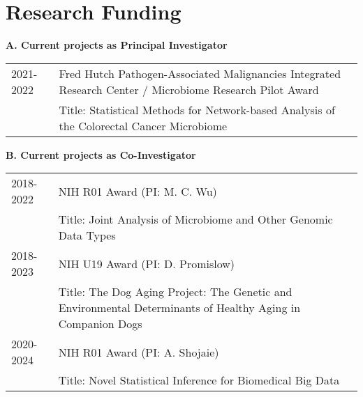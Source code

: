 \documentclass[10pt]{article}
\begin{document}

\section*{Research Funding }

\textbf{A. Current projects as Principal Investigator}
\begin{table}[H]
\hskip0.9cm\begin{tabular}{p{1.6cm}p{12cm}}
2021-2022 & Fred Hutch Pathogen-Associated Malignancies Integrated Research Center / Microbiome Research Pilot Award  \\
& Title: Statistical Methods for Network-based Analysis of the Colorectal Cancer Microbiome \\
\end{tabular}
\end{table}


\textbf{B. Current projects as Co-Investigator}

\begin{table}[H]
\hskip0.9cm\begin{tabular}{p{1.6cm}p{12cm}}
2018-2022 & NIH R01 Award (PI: M. C. Wu)  \\
& Title: Joint Analysis of Microbiome and Other Genomic Data Types\\
2018-2023 & NIH U19 Award (PI: D. Promislow) \\
& Title: The Dog Aging Project: The Genetic and Environmental Determinants of Healthy Aging in Companion Dogs\\
2020-2024 & NIH R01 Award (PI: A. Shojaie) \\
& Title: Novel Statistical Inference for Biomedical Big Data\\
\end{tabular}
\end{table}
\end{document}
